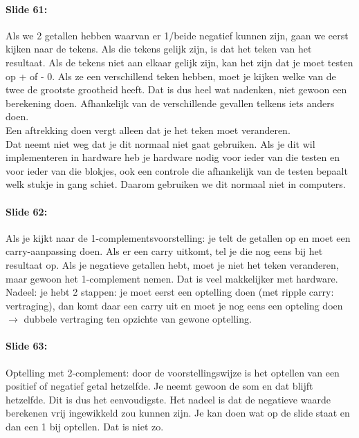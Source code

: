 \documentclass[10pt,a4paper]{book}
\begin{document}
\paragraph{Slide 61:} Als we 2 getallen hebben waarvan er 1/beide negatief kunnen zijn, gaan we eerst kijken naar de tekens. Als die tekens gelijk zijn, is dat het teken van het resultaat. Als de tekens niet aan elkaar gelijk zijn, kan het zijn dat je moet testen op + of - 0. Als ze een verschillend teken hebben, moet je kijken welke van de twee de grootste grootheid heeft. Dat is dus heel wat nadenken, niet gewoon een berekening doen. Afhankelijk van de verschillende gevallen telkens iets anders doen.\\
Een aftrekking doen vergt alleen dat je het teken moet veranderen.\\
Dat neemt niet weg dat je dit normaal niet gaat gebruiken. Als je dit wil implementeren in hardware heb je hardware nodig voor ieder van die testen en voor ieder van die blokjes, ook een controle die afhankelijk van de testen bepaalt welk stukje in gang schiet. Daarom gebruiken we dit normaal niet in computers.

\paragraph{Slide 62:} Als je kijkt naar de 1-complementsvoorstelling: je telt de getallen op en moet een carry-aanpassing doen. Als er een carry uitkomt, tel je die nog eens bij het resultaat op. Als je negatieve getallen hebt, moet je niet het teken veranderen, maar gewoon het 1-complement nemen. Dat is veel makkelijker met hardware.\\
Nadeel: je hebt 2 stappen: je moet eerst een optelling doen (met ripple carry: vertraging), dan komt daar een carry uit en moet je nog eens een opteling doen $\rightarrow$ dubbele vertraging ten opzichte van gewone optelling.

\paragraph{Slide 63:} Optelling met 2-complement: door de voorstellingswijze is het optellen van een positief of negatief getal hetzelfde. Je neemt gewoon de som en dat blijft hetzelfde. Dit is dus het eenvoudigste. Het nadeel is dat de negatieve waarde berekenen vrij ingewikkeld zou kunnen zijn. Je kan doen wat op de slide staat en dan een 1 bij optellen. Dat is niet zo.
\end{document}

